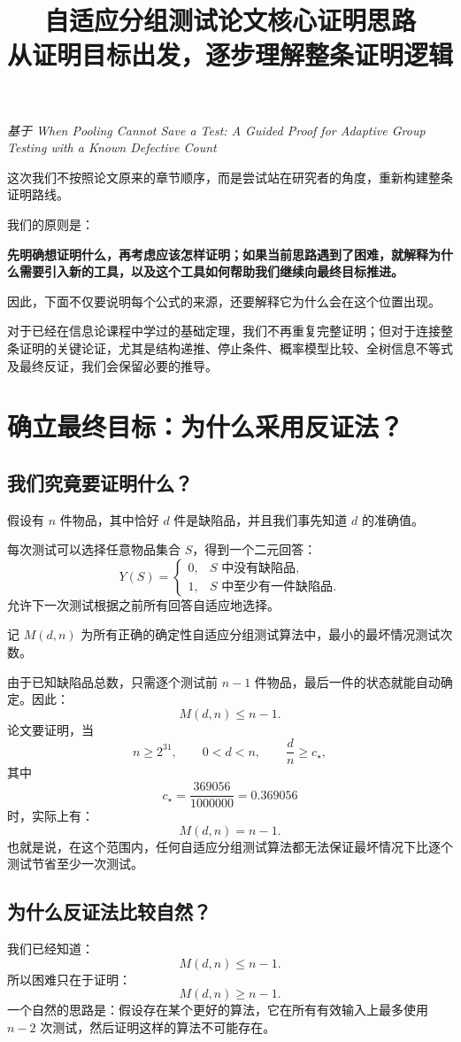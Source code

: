 \documentclass[UTF8,11pt]{ctexart}
\title{自适应分组测试论文核心证明思路\\[.5em]\large 从证明目标出发，逐步理解整条证明逻辑}
\author{}
\date{}
\begin{document}
\maketitle
\tableofcontents
\vspace{1em}
\noindent\textit{基于 \emph{When Pooling Cannot Save a Test: A Guided Proof for Adaptive Group Testing with a Known Defective Count}}\par

这次我们不按照论文原来的章节顺序，而是尝试站在研究者的角度，重新构建整条证明路线。

我们的原则是：

\textbf{先明确想证明什么，再考虑应该怎样证明；如果当前思路遇到了困难，就解释为什么需要引入新的工具，以及这个工具如何帮助我们继续向最终目标推进。}

因此，下面不仅要说明每个公式的来源，还要解释它为什么会在这个位置出现。

对于已经在信息论课程中学过的基础定理，我们不再重复完整证明；但对于连接整条证明的关键论证，尤其是结构递推、停止条件、概率模型比较、全树信息不等式及最终反证，我们会保留必要的推导。

\section{确立最终目标：为什么采用反证法？}
\subsection{我们究竟要证明什么？}
假设有 $n$ 件物品，其中恰好 $d$ 件是缺陷品，并且我们事先知道 $d$ 的准确值。

每次测试可以选择任意物品集合 $S$，得到一个二元回答：
\[
Y(S)=\begin{cases}0,&S\text{ 中没有缺陷品},\\1,&S\text{ 中至少有一件缺陷品}.\end{cases}
\]
允许下一次测试根据之前所有回答自适应地选择。

记 $M(d,n)$ 为所有正确的确定性自适应分组测试算法中，最小的最坏情况测试次数。

由于已知缺陷品总数，只需逐个测试前 $n-1$ 件物品，最后一件的状态就能自动确定。因此：
\[M(d,n)\le n-1.\]
论文要证明，当
\[n\ge2^{31},\qquad 0<d<n,\qquad\frac dn\ge c_\star,\]
其中
\[\boxed{c_\star=\frac{369056}{1000000}=0.369056}\]
时，实际上有：
\[\boxed{M(d,n)=n-1.}\]
也就是说，在这个范围内，任何自适应分组测试算法都无法保证最坏情况下比逐个测试节省至少一次测试。

\subsection{为什么反证法比较自然？}
我们已经知道：
\[M(d,n)\le n-1.\]
所以困难只在于证明：
\[M(d,n)\ge n-1.\]
一个自然的思路是：假设存在某个更好的算法，它在所有有效输入上最多使用 $n-2$ 次测试，然后证明这样的算法不可能存在。
\end{document}

